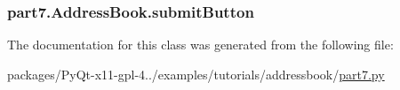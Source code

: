 \subsubsection[{submit\+Button}]{\setlength{\rightskip}{0pt plus 5cm}part7.\+Address\+Book.\+submit\+Button}\label{classpart7_1_1AddressBook_aed6a3f1cdeae5a4f3f6b21005010362d}


The documentation for this class was generated from the following file\+:\begin{DoxyCompactItemize}
\item 
packages/\+Py\+Qt-\/x11-\/gpl-\/4../examples/tutorials/addressbook/\hyperlink{part7_8py}{part7.\+py}\end{DoxyCompactItemize}
